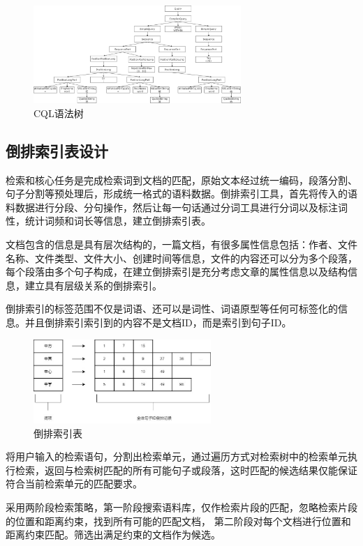 \documentclass[11pt]{article}
\begin{document}
\begin{CJK*}{UTF8}{gbsn}
\begin{figure}[h]
	\centering
	\includegraphics[width=0.7\textwidth]{cql-tree.jpg}
	\caption{CQL语法树}
	\label{fig:example}
\end{figure}

\subsection{倒排索引表设计}

检索和核心任务是完成检索词到文档的匹配，原始文本经过统一编码，段落分割、句子分割等预处理后，形成统一格式的语料数据。倒排索引工具，首先将传入的语料数据进行分段、分句操作，然后让每一句话通过分词工具进行分词以及标注词性，统计词频和词长等信息，建立倒排索引表。

文档包含的信息是具有层次结构的，一篇文档，有很多属性信息包括：作者、文件名称、文件类型、文件大小、创建时间等信息，文件的内容还可以分为多个段落，每个段落由多个句子构成，在建立倒排索引是充分考虑文章的属性信息以及结构信息，建立具有层级关系的倒排索引。

倒排索引的标签范围不仅是词语、还可以是词性、词语原型等任何可标签化的信息。并且倒排索引索引到的内容不是文档ID，而是索引到句子ID。

\begin{figure}[h]
	\centering
	\includegraphics[width=0.6\textwidth]{r-index.jpg}
	\caption{倒排索引表}
	\label{fig:example}
\end{figure}

将用户输入的检索语句，分割出检索单元，通过遍历方式对检索树中的检索单元执行检索，返回与检索树匹配的所有可能句子或段落，这时匹配的候选结果仅能保证符合当前检索单元的匹配要求。

采用两阶段检索策略，第一阶段搜索语料库，仅作检索片段的匹配，忽略检索片段的位置和距离约束，找到所有可能的匹配文档， 第二阶段对每个文档进行位置和距离约束匹配。筛选出满足约束的文档作为候选。


\end{CJK*}
\end{document}
